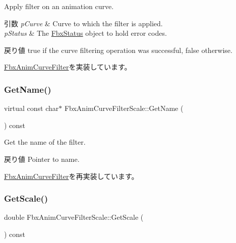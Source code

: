 Apply filter on an animation curve. 
\begin{DoxyParams}{引数}
{\em p\+Curve} & Curve to which the filter is applied. \\
\hline
{\em p\+Status} & The \hyperlink{class_fbx_status}{Fbx\+Status} object to hold error codes. \\
\hline
\end{DoxyParams}
\begin{DoxyReturn}{戻り値}
{\ttfamily true} if the curve filtering operation was successful, {\ttfamily false} otherwise. 
\end{DoxyReturn}


\hyperlink{class_fbx_anim_curve_filter_a6a69996c47c0e6f63a0f8b0d5fa806a0}{Fbx\+Anim\+Curve\+Filter}を実装しています。

\mbox{\label{class_fbx_anim_curve_filter_scale_afffa13f0b3bbdcaa0a6d88d6aea2c83f}} 
\subsubsection{\texorpdfstring{Get\+Name()}{GetName()}}
{\footnotesize\ttfamily virtual const char$\ast$ Fbx\+Anim\+Curve\+Filter\+Scale\+::\+Get\+Name (\begin{DoxyParamCaption}{ }\end{DoxyParamCaption}) const\hspace{0.3cm}{\ttfamily [virtual]}}

Get the name of the filter. \begin{DoxyReturn}{戻り値}
Pointer to name. 
\end{DoxyReturn}


\hyperlink{class_fbx_anim_curve_filter_abd559d5052fbb072042e59241940a35c}{Fbx\+Anim\+Curve\+Filter}を再実装しています。

\mbox{\label{class_fbx_anim_curve_filter_scale_a48367ab8cb65db9bffdda7dc8c0afff8}} 
\subsubsection{\texorpdfstring{Get\+Scale()}{GetScale()}}
{\footnotesize\ttfamily double Fbx\+Anim\+Curve\+Filter\+Scale\+::\+Get\+Scale (\begin{DoxyParamCaption}{ }\end{DoxyParamCaption}) const}

